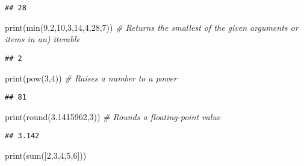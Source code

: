\documentclass[]{book}
\newenvironment{Shaded}{\begin{snugshade}}{\end{snugshade}}
\newcommand{\DecValTok}[1]{\textcolor[rgb]{0.00,0.00,0.81}{#1}}
\newcommand{\FloatTok}[1]{\textcolor[rgb]{0.00,0.00,0.81}{#1}}
\newcommand{\CommentTok}[1]{\textcolor[rgb]{0.56,0.35,0.01}{\textit{#1}}}
\newcommand{\BuiltInTok}[1]{#1}
\newcommand{\NormalTok}[1]{#1}
\theoremstyle{definition}
\theoremstyle{definition}
\theoremstyle{definition}
\theoremstyle{remark}
\begin{document}
\begin{verbatim}
## 28
\end{verbatim}

\begin{Shaded}
\begin{Highlighting}[]
\BuiltInTok{print}\NormalTok{(}\BuiltInTok{min}\NormalTok{(}\DecValTok{9}\NormalTok{,}\DecValTok{2}\NormalTok{,}\DecValTok{10}\NormalTok{,}\DecValTok{3}\NormalTok{,}\DecValTok{14}\NormalTok{,}\DecValTok{4}\NormalTok{,}\DecValTok{28}\NormalTok{,}\DecValTok{7}\NormalTok{))  }\CommentTok{# Returns the smallest of the given arguments or items in an) iterable}
\end{Highlighting}
\end{Shaded}

\begin{verbatim}
## 2
\end{verbatim}

\begin{Shaded}
\begin{Highlighting}[]
\BuiltInTok{print}\NormalTok{(}\BuiltInTok{pow}\NormalTok{(}\DecValTok{3}\NormalTok{,}\DecValTok{4}\NormalTok{))                   }\CommentTok{# Raises a number to a power}
\end{Highlighting}
\end{Shaded}

\begin{verbatim}
## 81
\end{verbatim}

\begin{Shaded}
\begin{Highlighting}[]
\BuiltInTok{print}\NormalTok{(}\BuiltInTok{round}\NormalTok{(}\FloatTok{3.1415962}\NormalTok{,}\DecValTok{3}\NormalTok{))         }\CommentTok{# Rounds a floating-point value}
\end{Highlighting}
\end{Shaded}

\begin{verbatim}
## 3.142
\end{verbatim}

\begin{Shaded}
\begin{Highlighting}[]
\BuiltInTok{print}\NormalTok{(}\BuiltInTok{sum}\NormalTok{([}\DecValTok{2}\NormalTok{,}\DecValTok{3}\NormalTok{,}\DecValTok{4}\NormalTok{,}\DecValTok{5}\NormalTok{,}\DecValTok{6}\NormalTok{]))       }
\end{Highlighting}
\end{Shaded}
\end{document}

